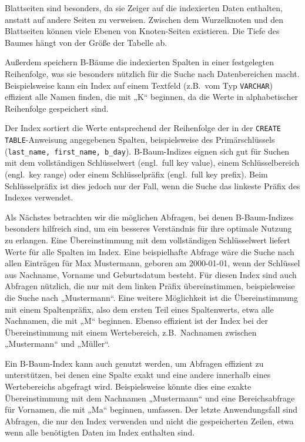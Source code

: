 Blattseiten sind besonders, da sie Zeiger auf die indexierten Daten enthalten, anstatt auf andere Seiten zu verweisen.
Zwischen dem Wurzelknoten und den Blattseiten können viele Ebenen von Knoten-Seiten existieren.
Die Tiefe des Baumes hängt von der Größe der Tabelle ab.

Außerdem speichern B-Bäume die indexierten Spalten in einer festgelegten Reihenfolge, was sie besonders nützlich für die Suche nach Datenbereichen macht.
Beispielsweise kann ein Index auf einem Textfeld (z.B.\ vom Typ \texttt{VARCHAR}) effizient alle Namen finden, die mit „K“ beginnen, da die Werte in alphabetischer Reihenfolge gespeichert sind.

Der Index sortiert die Werte entsprechend der Reihenfolge der in der \texttt{CREATE TABLE}-Anweisung angegebenen Spalten, beispielsweise des Primärschlüssels (\texttt{last\_name, first\_name, b\_day}).
B-Baum-Indizes eignen sich gut für Suchen mit dem vollständigen Schlüsselwert (engl.\ full key value), einem Schlüsselbereich (engl.\ key range) oder einem Schlüsselpräfix (engl.\ full key prefix).
Beim Schlüsselpräfix ist dies jedoch nur der Fall, wenn die Suche das linkeste Präfix des Indexes verwendet.

Als Nächstes betrachten wir die möglichen Abfragen, bei denen B-Baum-Indizes besonders hilfreich sind, um ein besseres Verständnis für ihre optimale Nutzung zu erlangen.
Eine Übereinstimmung mit dem vollständigen Schlüsselwert liefert Werte für alle Spalten im Index.
Eine beispielhafte Abfrage wäre die Suche nach allen Einträgen für Max Mustermann, geboren am 2000-01-01, wenn der Schlüssel aus Nachname, Vorname und Geburtsdatum besteht.
Für diesen Index sind auch Abfragen nützlich, die nur mit dem linken Präfix übereinstimmen, beispielsweise die Suche nach „Mustermann“.
Eine weitere Möglichkeit ist die Übereinstimmung mit einem Spaltenpräfix, also dem ersten Teil eines Spaltenwerts, etwa alle Nachnamen, die mit „M“ beginnen.
Ebenso effizient ist der Index bei der Übereinstimmung mit einem Wertebereich, z.B.\ Nachnamen zwischen „Mustermann“ und „Müller“.

Ein B-Baum-Index kann auch genutzt werden, um Abfragen effizient zu unterstützen, bei denen eine Spalte exakt und eine andere innerhalb eines Wertebereichs abgefragt wird.
Beispielsweise könnte dies eine exakte Übereinstimmung mit dem Nachnamen „Mustermann“ und eine Bereichsabfrage für Vornamen, die mit „Ma“ beginnen, umfassen.
Der letzte Anwendungsfall sind Abfragen, die nur den Index verwenden und nicht die gespeicherten Zeilen, etwa wenn alle benötigten Daten im Index enthalten sind.

